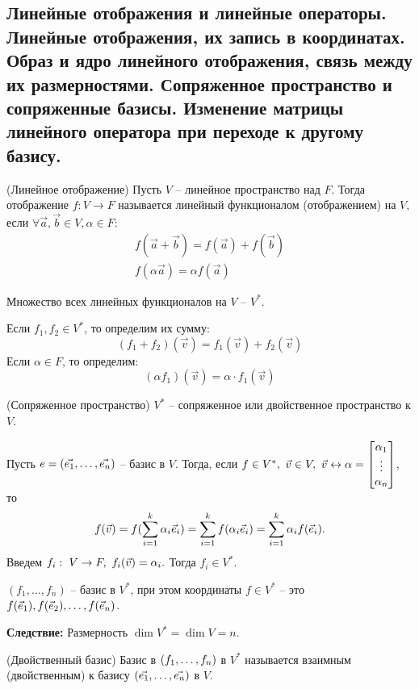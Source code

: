\begin{multicols}{2}
\section{Линейные отображения и линейные операторы. Линейные отображения, их запись в
координатах. Образ и ядро линейного отображения, связь между их размерностями.
Сопряженное пространство и сопряженные базисы. Изменение матрицы линейного
оператора при переходе к другому базису.}
\begin{definition}{(Линейное отображение)}{}
    Пусть $V$ -- линейное пространство над $F$. Тогда отображение $f: V\to F$ называется линейный функционалом (отображением) на $V$, если $\forall \vec{a}, \vec{b} \in V, \alpha \in F$:
    \[
        \begin{array}{c}
            f(\vec{a} + \vec{b}) = f(\vec{a}) + f(\vec{b})\\
            f(\alpha \vec{a}) = \alpha f(\vec{a})            
        \end{array}
        \]
\end{definition}
Множество всех линейных функционалов на $V$ -- $V^*$.\par
Если $f_1, f_2 \in V^*$, то определим их сумму:
\[
    (f_1+f_2)(\vec{v}) = f_1(\vec{v}) + f_2(\vec{v})
    \]
Если $\alpha \in F$, то определим:
\[
    (\alpha f_1)(\vec{v}) = \alpha\cdot f_1(\vec{v})
    \]
\begin{definition}{(Сопряженное пространство)}{}
    $V^*$ -- сопряженное или двойственное пространство к $V$.
\end{definition}
Пусть $e = (\vec{e_1}, \ldots, \vec{e_n})$ -- базис в $V$. Тогда, если $f\in V^*, \ \vv \in V, \ \vv\leftrightarrow \alpha = \begin{bmatrix}
    \alpha_1 \\
    \vdots \\ \alpha_n
\end{bmatrix}$, то 
\[
    f(\vec{v}) = f(\sum\limits_{i=1}^k \alpha_i \vec{e}_i) = \sum\limits_{i=1}^k f(\alpha_i \vec{e}_i) = \sum\limits_{i=1}^k \alpha_i f(\vec{e}_i).
    \]
Введем $f_i: \ V \to F, \ f_i(\vec{v}) = \alpha_i.$ Тогда $f_i \in V^*$.
\begin{proposition}{}{}
    $(f_1, \ldots, f_n)$ -- базис в $V^*$, при этом координаты $f\in V^*$ -- это $f(\vec{e}_1), f(\vec{e}_2), \ldots, f(\vec{e}_n)$.
\end{proposition}
\textbf{Следствие: } Размерность $\dim V^* = \dim V = n$.
\begin{definition}{(Двойственный базис)}{}
    Базис в $(f_1, \ldots, f_n)$ в $V^*$ называется взаимным (двойственным) к базису $(\vec{e_1}, \ldots, \vec{e_n})$ в $V$.

\end{definition}
\end{multicols}
